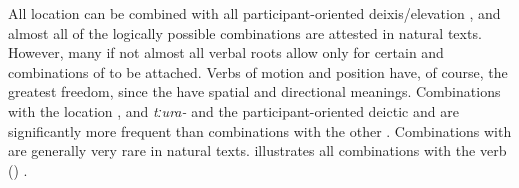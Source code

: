 All location  can be combined with all participant-oriented deixis/elevation , and almost all of the logically possible combinations are attested in natural texts. However, many if not almost all verbal roots allow only for certain  and combinations of  to be attached. Verbs of motion and position have, of course, the greatest freedom, since the  have spatial and directional meanings. Combinations with the location  , and \textit{tːura-} and the participant-oriented deictic   and  are significantly more frequent than combinations with the other . Combinations with  are generally very rare in natural texts.  illustrates all combinations with the verb  () .
%
